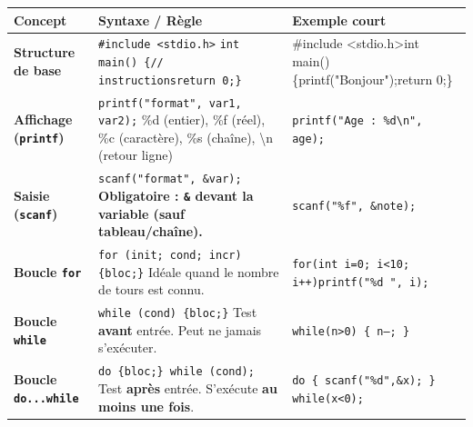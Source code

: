 \documentclass[11pt]{article}
\begin{document}
\begin{bilan}
\begin{center}
\begin{tabularx}{\linewidth}{|>{\bfseries}l|X|>{\ttfamily\small}l|}
\hline
\rowcolor{popblueL}
\textbf{Concept} & \textbf{Syntaxe / Règle} & \textbf{Exemple court} \\
\hline
Structure de base &
\texttt{\#include <stdio.h>}\newline
\texttt{int main() \{\newline\quad // instructions\newline\quad return 0;\newline\}} &
{\ttfamily\tiny \#include <stdio.h>\newline int main() \{\newline\quad printf("Bonjour");\newline\quad return 0;\newline\}} \\
\hline
Affichage (\texttt{printf}) &
\texttt{printf("format", var1, var2);}\newline
\%d (entier), \%f (réel), \%c (caractère), \%s (chaîne), \textbackslash n (retour ligne) &
\texttt{printf("Age : \%d\textbackslash n", age);} \\
\hline
Saisie (\texttt{scanf}) &
\texttt{scanf("format", \&var);}\newline
\textbf{Obligatoire : \texttt{\&} devant la variable (sauf tableau/chaîne).} &
\texttt{scanf("\%f", \&note);} \\
\hline
Boucle \texttt{for} &
\texttt{for (init; cond; incr) \{\newline\quad bloc;\newline\}}\newline
Idéale quand le nombre de tours est connu. &
\texttt{for(int i=0; i<10; i++)\newline\quad printf("\%d ", i);} \\
\hline
Boucle \texttt{while} &
\texttt{while (cond) \{\newline\quad bloc;\newline\}}\newline
Test \textbf{avant} entrée. Peut ne jamais s'exécuter. &
\texttt{while(n>0) \{ n--; \}} \\
\hline
Boucle \texttt{do...while} &
\texttt{do \{\newline\quad bloc;\newline\} while (cond);}\newline
Test \textbf{après} entrée. S'exécute \textbf{au moins une fois}. &
\texttt{do \{ scanf("\%d",\&x); \} while(x<0);} \\

\end{tabularx}
\end{center}
\end{bilan}
\end{document}
